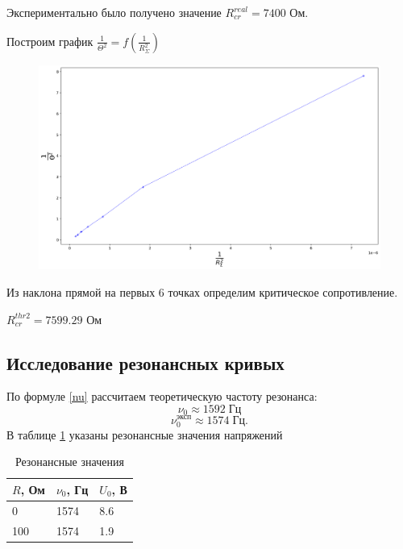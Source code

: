 \documentclass{lab}
\begin{document}
Экспериментально было получено значение $R_{cr}^{real} = 7400$ Ом.

Построим график $\frac{1}{\Theta^2} = f (\frac{1}{R_\Sigma^2})$

\begin{figure}[h!]
\begin{center}
\includegraphics[width=1\textwidth]{graph1.png}
\end{center}
\end{figure}

Из наклона прямой на первых 6 точках определим критическое сопротивление.

$R_{cr}^{thr2} = 7599.29$ Ом

\subsection{Исследование резонансных кривых}

По формуле \ref{nu} рассчитаем теоретическую частоту резонанса:
\begin{equation}
    \nu_0\approx 1592 \; \text{Гц}
\end{equation}
\begin{equation}
    \nu_0^\text{эксп} \approx 1574 \; \text{Гц}.
\end{equation}
В таблице \ref{res} указаны резонансные значения напряжений

\begin{table}[]
    \centering
    \begin{tabular}{|l|l|l|}
        \hline
        \textbf{$R$, Ом} & \textbf{$\nu_0$, Гц} & \textbf{$U_0$, В} \\ \hline
        0                & 1574                 & 8.6               \\ \hline
        100              & 1574                 & 1.9               \\ \hline
    \end{tabular}
    \caption{Резонансные значения}
    \label{res}
\end{table}
\end{document}
